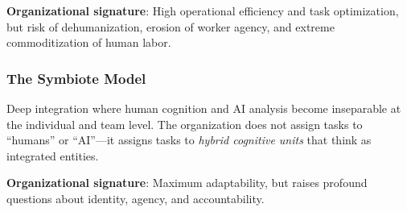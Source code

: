 \documentclass[11pt,a4paper,twocolumn]{article}
\begin{document}
\textbf{Organizational signature}: High operational efficiency and task optimization, but risk of dehumanization, erosion of worker agency, and extreme commoditization of human labor.

\subsubsection{The Symbiote Model}
Deep integration where human cognition and AI analysis become inseparable at the individual and team level. The organization does not assign tasks to ``humans'' or ``AI''---it assigns tasks to \textit{hybrid cognitive units} that think as integrated entities.

\textbf{Organizational signature}: Maximum adaptability, but raises profound questions about identity, agency, and accountability.
\end{document}
